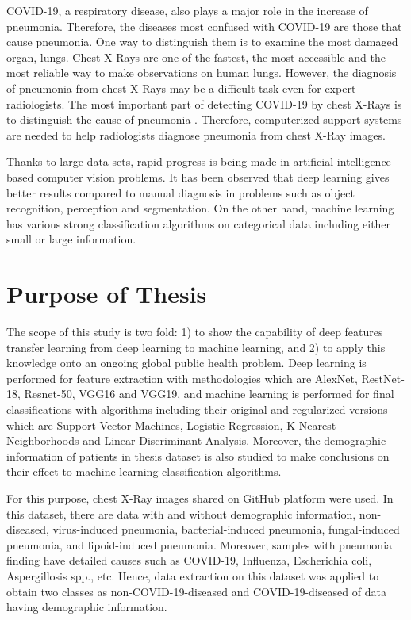 COVID-19, a respiratory disease, also plays a major role in the increase of pneumonia. Therefore, the diseases most confused with COVID-19 are those that cause pneumonia. One way to distinguish them is to examine the most damaged organ, lungs. Chest X-Rays are one of the fastest, the most accessible and the most reliable way to make observations on human lungs. However, the diagnosis of pneumonia from chest X-Rays may be a difficult task even for expert radiologists. The most important part of detecting COVID-19 by chest X-Rays is to distinguish the cause of pneumonia \cite{covid_vs_pneumonia}. Therefore, computerized support systems are needed to help radiologists diagnose pneumonia from chest X-Ray images.

Thanks to large data sets, rapid progress is being made in artificial intelligence-based computer vision problems. It has been observed that deep learning gives better results compared to manual diagnosis in problems such as object recognition, perception and segmentation. On the other hand, machine learning has various strong classification algorithms on categorical data including either small or large information. 

\section{Purpose of Thesis}\label{purposeofthesis}

The scope of this study is two fold: 1) to show the capability of deep features transfer learning from deep learning to machine learning, and 2) to apply this knowledge onto an ongoing global public health problem. Deep learning is performed for feature extraction with methodologies which are AlexNet, RestNet-18, Resnet-50, VGG16 and VGG19, and machine learning is performed for final classifications with algorithms including their original and regularized versions which are Support Vector Machines, Logistic Regression, K-Nearest Neighborhoods and Linear Discriminant Analysis. Moreover, the demographic information of patients in thesis dataset is also studied to make conclusions on their effect to machine learning classification algorithms.

For this purpose, chest X-Ray images shared on GitHub platform were used. In this dataset, there are data with and without demographic information, non-diseased, virus-induced pneumonia, bacterial-induced pneumonia, fungal-induced pneumonia, and lipoid-induced pneumonia. Moreover, samples with pneumonia finding have detailed causes such as COVID-19, Influenza, Escherichia coli, Aspergillosis spp., etc. Hence, data extraction on this dataset was applied to obtain two classes as non-COVID-19-diseased and COVID-19-diseased of data having demographic information.

